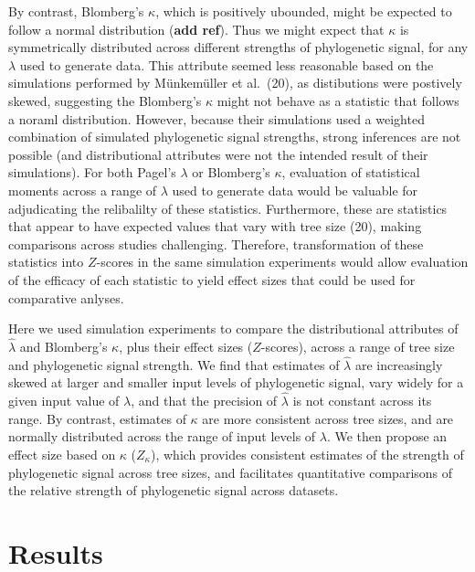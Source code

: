 \documentclass[9pt,twocolumn,twoside,lineno]{pnas-new}
\begin{document}
By contrast, Blomberg's \(\kappa\), which is positively ubounded, might
be expected to follow a normal distribution (\textbf{add ref}). Thus we
might expect that \(\kappa\) is symmetrically distributed across
different strengths of phylogenetic signal, for any \(\lambda\) used to
generate data. This attribute seemed less reasonable based on the
simulations performed by Münkemüller et al.~(20), as distibutions were
postively skewed, suggesting the Blomberg's \(\kappa\) might not behave
as a statistic that follows a noraml distribution. However, because
their simulations used a weighted combination of simulated phylogenetic
signal strengths, strong inferences are not possible (and distributional
attributes were not the intended result of their simulations). For both
Pagel's \(\lambda\) or Blomberg's \(\kappa\), evaluation of statistical
moments across a range of \(\lambda\) used to generate data would be
valuable for adjudicating the relibalilty of these statistics.
Furthermore, these are statistics that appear to have expected values
that vary with tree size (20), making comparisons across studies
challenging. Therefore, transformation of these statistics into
\(Z\)-scores in the same simulation experiments would allow evaluation
of the efficacy of each statistic to yield effect sizes that could be
used for comparative anlyses.

Here we used simulation experiments to compare the distributional
attributes of \(\hat{\lambda}\) and Blomberg's \(\kappa\), plus their
effect sizes (\(Z\)-scores), across a range of tree size and
phylogenetic signal strength. We find that estimates of
\(\hat{\lambda}\) are increasingly skewed at larger and smaller input
levels of phylogenetic signal, vary widely for a given input value of
\(\lambda\), and that the precision of \(\hat{\lambda}\) is not constant
across its range. By contrast, estimates of \(\kappa\) are more
consistent across tree sizes, and are normally distributed across the
range of input levels of \(\lambda\). We then propose an effect size
based on \(\kappa\) (\(Z_{\kappa}\)), which provides consistent
estimates of the strength of phylogenetic signal across tree sizes, and
facilitates quantitative comparisons of the relative strength of
phylogenetic signal across datasets.

\hypertarget{results}{%
\section{Results}\label{results}}
\end{document}
